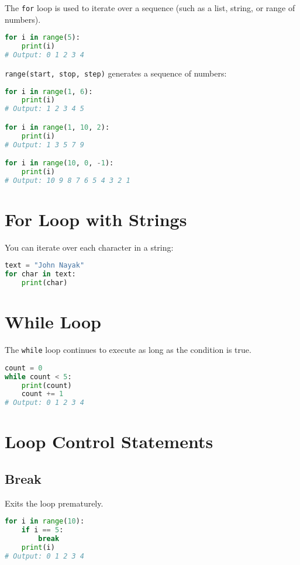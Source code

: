 The \texttt{for} loop is used to iterate over a sequence (such as a list, string, or range of numbers).

\begin{lstlisting}[language=Python]
for i in range(5):
    print(i)
# Output: 0 1 2 3 4
\end{lstlisting}

\texttt{range(start, stop, step)} generates a sequence of numbers:
\begin{lstlisting}[language=Python]
for i in range(1, 6):
    print(i)
# Output: 1 2 3 4 5

for i in range(1, 10, 2):
    print(i)
# Output: 1 3 5 7 9

for i in range(10, 0, -1):
    print(i)
# Output: 10 9 8 7 6 5 4 3 2 1
\end{lstlisting}

\section{For Loop with Strings}

You can iterate over each character in a string:

\begin{lstlisting}[language=Python]
text = "John Nayak"
for char in text:
    print(char)
\end{lstlisting}

\section{While Loop}

The \texttt{while} loop continues to execute as long as the condition is true.

\begin{lstlisting}[language=Python]
count = 0
while count < 5:
    print(count)
    count += 1
# Output: 0 1 2 3 4
\end{lstlisting}

\section{Loop Control Statements}

\subsection{Break}

Exits the loop prematurely.

\begin{lstlisting}[language=Python]
for i in range(10):
    if i == 5:
        break
    print(i)
# Output: 0 1 2 3 4
\end{lstlisting}

